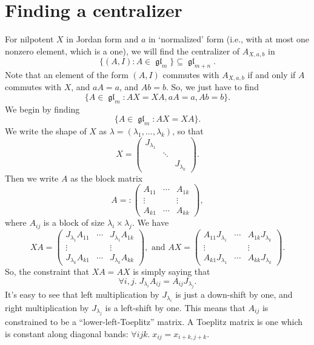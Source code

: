 \documentclass[12pt,psamsfonts]{article}
\DeclareMathOperator{\gl}{\mathfrak{gl}}
\begin{document}
\section{Finding a centralizer}
For nilpotent \(X\) in Jordan form and \(a\) in `normalized' form (i.e., with at most one nonzero element, which is a one), we will find the centralizer of \(A_{X, a, b}\) in 
\[\{(A, I) : A \in \gl_m\} \subseteq \gl_{m + n}.\]
Note that an element of the form \((A, I)\) commutes with \(A_{X, a, b}\) if and only if \(A\) commutes with \(X\), and \(aA = a\), and \(Ab = b\).
So, we just have to find 
\[\{A \in \gl_m : AX = XA, aA = a, Ab = b\}.\]
We begin by finding 
\[\{A \in \gl_m : AX = XA\}.\]
We write the shape of \(X\) as \(\lambda = (\lambda_1, ..., \lambda_k)\), so that 
\[X = \begin{pmatrix}
    J_{\lambda_1} & \\
    & \ddots \\
    & & J_{\lambda_k}
\end{pmatrix}.\]
Then we write \(A\) as the block matrix
\[A =: \begin{pmatrix}
    A_{11} & \cdots & A_{1k}\\
    \vdots & & \vdots\\
    A_{k1} & \cdots & A_{kk}
\end{pmatrix},\]
where \(A_{ij}\) is a block of size \(\lambda_i \times \lambda_j\).
We have 
\[XA = \begin{pmatrix}
    J_{\lambda_1}A_{11} & \cdots & J_{\lambda_1}A_{1k}\\
    \vdots & & \vdots\\
    J_{\lambda_k}A_{k1} & \cdots & J_{\lambda_k}A_{kk}
\end{pmatrix}, \textrm{ and } AX = \begin{pmatrix}
    A_{11} J_{\lambda_1} & \cdots & A_{1k} J_{\lambda_k}\\
    \vdots & & \vdots\\
    A_{k1} J_{\lambda_1} & \cdots & A_{kk} J_{\lambda_k}
\end{pmatrix}.\]
So, the constraint that \(XA = AX\) is simply saying that 
\[\forall i,j. \; J_{\lambda_i} A_{ij} = A_{ij} J_{\lambda_j}.\]
It's easy to see that left multiplication by \(J_{\lambda_i}\) is just a down-shift by one, and right multiplication by \(J_{\lambda_j}\) is a left-shift by one.
This means that \(A_{ij}\) is constrained to be a ``lower-left-Toeplitz'' matrix.
A Toeplitz matrix is one which is constant along diagonal bands: \(\forall ijk. \; x_{ij} = x_{i + k,j + k}\).
\end{document}
